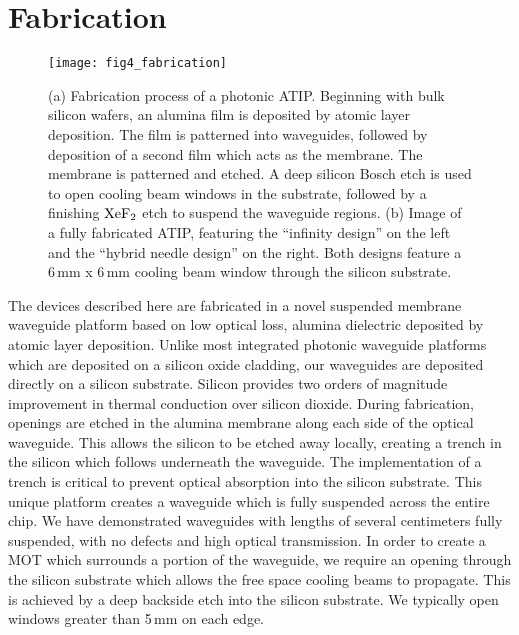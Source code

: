 \documentclass{osa-article}
\begin{document}
\section{Fabrication}

\begin{figure}[b!]
\centering\texttt{[image: fig4\_fabrication]}
\caption{(a) Fabrication process of a photonic ATIP.  Beginning with bulk silicon wafers, an alumina film is deposited by atomic layer deposition.  The film is patterned into waveguides, followed by deposition of a second film which acts as the membrane.  The membrane is patterned and etched.  A deep silicon Bosch etch is used to open cooling beam windows in the substrate, followed by a finishing $\rm{XeF_2}$ etch to suspend the waveguide regions. (b) Image of a fully fabricated ATIP, featuring the ``infinity design'' on the left and the ``hybrid needle design'' on the right.  Both designs feature a 6\,mm x 6\,mm cooling beam window through the silicon substrate.}
\label{fig_4}
\end{figure}

The devices described here are fabricated in a novel suspended membrane waveguide platform based on low optical loss, alumina dielectric deposited by atomic layer deposition.  Unlike most integrated photonic waveguide platforms which are deposited on a silicon oxide cladding, our waveguides are deposited directly on a silicon substrate.  Silicon provides two orders of magnitude improvement in thermal conduction over silicon dioxide.  During fabrication, openings are etched in the alumina membrane along each side of the optical waveguide.  This allows the silicon to be etched away locally, creating a trench in the silicon which follows underneath the waveguide.  The implementation of a trench is critical to prevent optical absorption into the silicon substrate.  This unique platform creates a waveguide which is fully suspended across the entire chip.  We have demonstrated waveguides with lengths of several centimeters fully suspended, with no defects and high optical transmission. In order to create a MOT which surrounds a portion of the waveguide, we require an opening through the silicon substrate which allows the free space cooling beams to propagate.  This is achieved by a deep backside etch into the silicon substrate.  We typically open windows greater than 5\,mm on each edge. 
\end{document}
